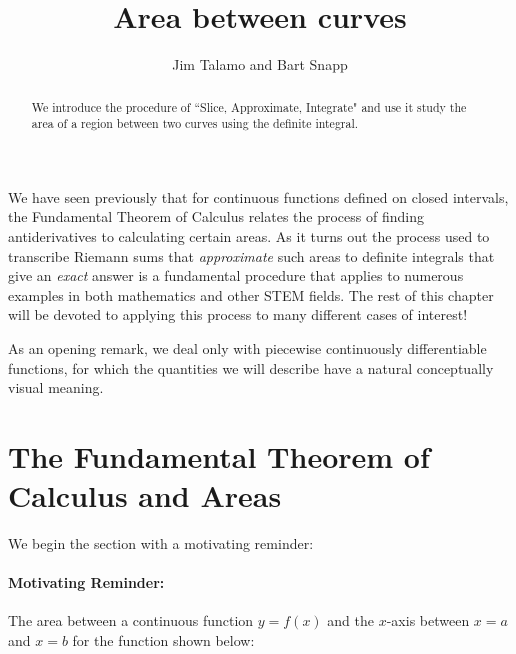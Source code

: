 \documentclass{ximera}
\author{Jim Talamo and Bart Snapp}
\title[Dig-In:]{Area between curves}
\begin{document}
\begin{abstract}
  We introduce the procedure of ``Slice, Approximate, Integrate" and use it study the area of a region between two curves using the definite integral.
\end{abstract}
\maketitle

We have seen previously that for continuous functions defined on closed intervals, the Fundamental Theorem of Calculus relates the process of finding antiderivatives to calculating certain areas.  As it turns out the process used to transcribe Riemann sums that \emph{approximate} such areas to definite integrals that give an \emph{exact} answer is a fundamental procedure that applies to numerous examples in both mathematics and other STEM fields.  The rest of this chapter will be devoted to applying this process to many different cases of interest! 

As an opening remark, we deal only with piecewise continuously differentiable functions, for which the quantities we will describe have a natural conceptually visual meaning.


\section{The Fundamental Theorem of Calculus and Areas}

We begin the section with a motivating reminder:

\paragraph{Motivating Reminder:} The area between a continuous function $y=f(x)$ and the $x$-axis between $x=a$ and $x=b$ for the function shown below:

\end{document}
